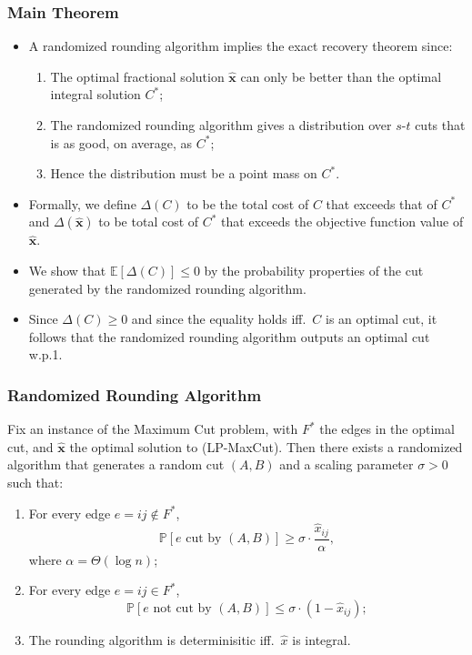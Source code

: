 \documentclass{beamer}
\newcommand{\EE}{\mathbb{E}}
\newcommand{\PP}{\mathbb{P}}
\begin{document}
    \begin{frame}
        \frametitle{Main Theorem}

        \begin{itemize}
            \item A randomized rounding algorithm implies the exact recovery theorem since: \pause
            \begin{enumerate}
                \item The optimal fractional solution $\mathbf{\hat x}$ can only be better than the optimal integral solution $C^*$; \pause
                \item The randomized rounding algorithm gives a distribution over $s$-$t$ cuts that is as good, on average, as $C^*$; \pause
                \item Hence the distribution must be a point mass on $C^*$.
            \end{enumerate}
            \pause
            \item Formally, we define $\Delta(C)$ to be the total cost of $C$ that exceeds that of $C^*$ and $\Delta(\mathbf{\hat x})$ to be total cost of $C^*$ that exceeds the objective function value of $\mathbf{\hat x}$. \pause
            \item We show that $\EE[\Delta(C)] \leq 0$ by the probability properties of the cut generated by the randomized rounding algorithm. \pause
            \item Since $\Delta(C) \geq 0$ and since the equality holds iff.\ $C$ is an optimal cut, it follows that the randomized rounding algorithm outputs an optimal cut w.p.1.
        \end{itemize}
    \end{frame}

    \begin{frame}
        \frametitle{Randomized Rounding Algorithm}
    
        \begin{lemma}
            Fix an instance of the {\sc Maximum Cut} problem, with $F^*$ the edges in the optimal cut, and $\mathbf{\hat x}$ the optimal solution to {\sc (LP-MaxCut)}. Then there exists a randomized algorithm that generates a random cut $(A, B)$ and a scaling parameter $\sigma > 0$ such that:
            \begin{enumerate}
                \item For every edge $e = ij \not \in F^*$,
                $$ \PP[\text{$e$ cut by $(A, B)$}] \geq \sigma \cdot \frac{\hat x_{ij}}{\alpha}, $$
                where $\alpha = \Theta(\log n)$;
                \item For every edge $e = ij \in F^*$,
                $$ \PP[\text{$e$ not cut by $(A, B)$}] \leq \sigma \cdot (1 - \hat x_{ij}); $$
                \item The rounding algorithm is determinisitic iff.\ $\hat x$ is integral.
            \end{enumerate}
        \end{lemma}
    \end{frame}
\end{document}
